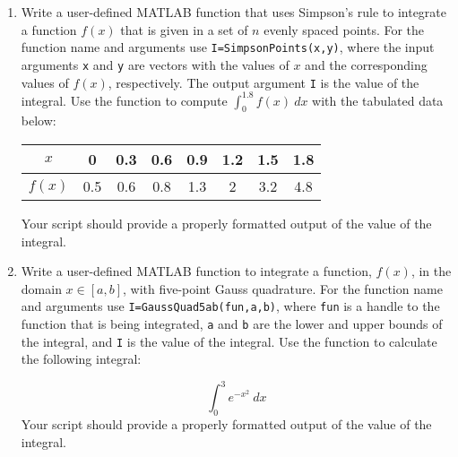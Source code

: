\begin{fullwidth}

\begin{enumerate}[resume]
\item Write a user-defined MATLAB function that uses Simpson's rule to integrate a function $f(x)$ that is given in a set of $n$ evenly spaced points.  For the function name and arguments use \lstinline[style=myMatlab]{I=SimpsonPoints(x,y)}, where the input arguments \lstinline[style=myMatlab]{x} and \lstinline[style=myMatlab]{y} are vectors with the values of $x$ and the corresponding values of $f(x)$, respectively.  The output argument \lstinline[style=myMatlab]{I} is the value of the integral.  Use the function to compute $\int_{0}^{1.8} f(x) \ dx$ with the tabulated data below:

\begin{table}[h!]
\begin{tabular}{|c|c|c|c|c|c|c|c|} 
\hline
$x$ & 0 & 0.3 & 0.6 & 0.9 & 1.2 & 1.5 & 1.8 \\ \hline
$f(x)$ & 0.5 & 0.6 & 0.8 & 1.3 & 2 & 3.2 & 4.8 \\ \hline
\end{tabular}
\end{table}
Your script should provide a properly formatted output of the value of the integral.

\vspace{3.0cm}

\item Write a user-defined MATLAB function to integrate a function, $f(x)$, in the domain $x \in [a,b]$, with five-point Gauss quadrature.  For the function name and arguments use \lstinline[style=myMatlab]{I=GaussQuad5ab(fun,a,b)}, where \lstinline[style=myMatlab]{fun} is a handle to the function that is being integrated, \lstinline[style=myMatlab]{a} and \lstinline[style=myMatlab]{b} are the lower and upper bounds of the integral, and \lstinline[style=myMatlab]{I} is the value of the integral.  Use the function to calculate the following integral:

\begin{equation*}
\int_{0}^{3} e^{-x^2} \ dx
\end{equation*}
Your script should provide a properly formatted output of the value of the integral.


\end{enumerate}
\end{fullwidth}




